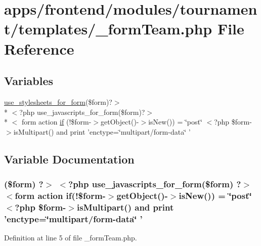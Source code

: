\hypertarget{frontend_2modules_2tournament_2templates_2__form_team_8php}{\section{apps/frontend/modules/tournament/templates/\-\_\-form\-Team.php File Reference}
\label{frontend_2modules_2tournament_2templates_2__form_team_8php}
}
\subsection*{Variables}
\begin{DoxyCompactItemize}
\item 
\hyperlink{live_2modules_2user_2templates_2__form_8php_a86bc4522fdbe625b07bc4a4d6eec3df7}{use\-\_\-stylesheets\-\_\-for\-\_\-form}(\$form)?$>$\\*
$<$?php use\-\_\-javascripts\-\_\-for\-\_\-form(\$form)?$>$\\*
$<$ form action \hyperlink{frontend_2modules_2tournament_2templates_2__form_team_8php_ae30a307b320d8da5d9a945eaf68f7549}{if} (!\$form-\/$>$get\-Object()-\/$>$is\-New()) = \char`\"{}post\char`\"{} $<$?php \$form-\/$>$is\-Multipart() and print 'enctype=\char`\"{}multipart/form-\/data\char`\"{} '
\end{DoxyCompactItemize}


\subsection{Variable Documentation}
\hypertarget{frontend_2modules_2tournament_2templates_2__form_team_8php_ae30a307b320d8da5d9a945eaf68f7549}{
\subsubsection[{if}]{ (\$form) ?$>$ $<$?php use\-\_\-javascripts\-\_\-for\-\_\-form(\$form) ?$>$ $<$form action if(!\$form-\/$>$get\-Object()-\/$>$is\-New()) = \char`\"{}post\char`\"{} $<$?php \$form-\/$>$is\-Multipart() and print 'enctype=\char`\"{}multipart/form-\/data\char`\"{} '}}\label{frontend_2modules_2tournament_2templates_2__form_team_8php_ae30a307b320d8da5d9a945eaf68f7549}


Definition at line 5 of file \-\_\-form\-Team.\-php.

